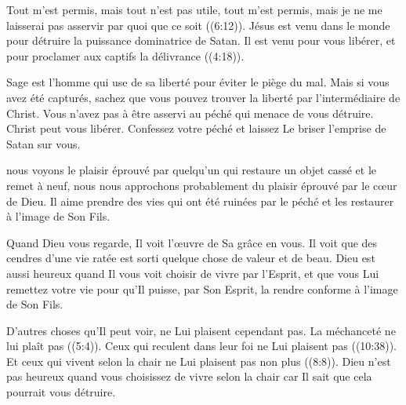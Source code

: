 
\og Tout m'est permis, mais tout n'est pas utile,
 tout m'est permis, mais je ne me laisserai pas asservir
 par quoi que ce soit \fg{} ((6:12)).
 Jésus est venu dans le monde pour détruire
 la puissance dominatrice de Satan.
 Il est venu pour vous libérer,
 et \og pour proclamer aux captifs la délivrance \fg{} ((4:18)).

Sage est l'homme qui use de sa liberté pour éviter le piège du mal.
 Mais si vous avez été capturés, sachez que vous pouvez trouver la liberté
 par l'intermédiaire de Christ.
 Vous n'avez pas à être asservi au péché qui menace de vous détruire.
 Christ peut vous libérer. Confessez votre péché et laissez Le briser
 l'emprise de Satan sur vous. 

\dvrule






 nous voyons le plaisir éprouvé par quelqu'un
 qui restaure un objet cassé et le remet à neuf,
 nous nous approchons probablement du plaisir éprouvé par le c\oe{}ur de Dieu.
 Il aime prendre des vies qui ont été ruinées par le péché
 et les restaurer à l'image de Son Fils. 

Quand Dieu vous regarde, Il voit l'\oe{}uvre de Sa grâce en vous.
 Il voit que des cendres d'une vie ratée est sorti quelque chose
 de valeur et de beau.
 Dieu est aussi heureux quand Il vous voit choisir de vivre par l'Esprit,
 et que vous Lui remettez votre vie pour qu'Il puisse, par Son Esprit,
 la rendre conforme à l'image de Son Fils. 


D'autres choses qu'Il peut voir, ne Lui plaisent cependant pas.
 La méchanceté ne lui plaît pas ((5:4)).
 Ceux qui reculent dans leur foi ne Lui plaisent pas ((10:38)).
 Et ceux qui vivent selon la chair ne Lui plaisent pas non plus
 ((8:8)).
 Dieu n'est pas heureux quand vous choisissez de vivre selon la chair
 car Il sait que cela pourrait vous détruire. 

